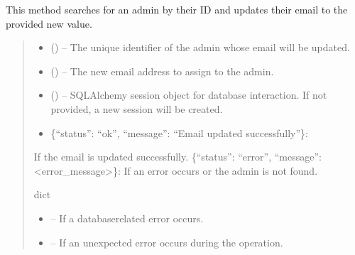 \documentclass[letterpaper,10pt,english]{sphinxmanual}
\begin{document}
\begin{fulllineitems}
\begin{fulllineitems}
\sphinxAtStartPar
This method searches for an admin by their ID and updates their email to the provided new value.
\begin{quote}\begin{description}
\begin{itemize}
\item {} 
\sphinxAtStartPar
{} () – The unique identifier of the admin whose email will be updated.

\item {} 
\sphinxAtStartPar
{} () – The new email address to assign to the admin.

\item {} 
\sphinxAtStartPar
{} (\sphinxstyleliteralemphasis{\sphinxupquote{, }}) – SQLAlchemy session object for database interaction.
If not provided, a new session will be created.

\end{itemize}

\sphinxAtStartPar
\begin{description}
\begin{itemize}
\item {} 
\sphinxAtStartPar
\{“status”: “ok”, “message”: “Email updated successfully”\}:

\end{itemize}

\sphinxAtStartPar
If the email is updated successfully.
\sphinxhyphen{} \{“status”: “error”, “message”: <error\_message>\}:
If an error occurs or the admin is not found.

\end{description}


\sphinxAtStartPar
dict

\begin{itemize}
\item {} 
\sphinxAtStartPar
{} – If a database\sphinxhyphen{}related error occurs.

\item {} 
\sphinxAtStartPar
{} – If an unexpected error occurs during the operation.


\end{itemize}
\end{description}
\end{quote}
\end{fulllineitems}
\end{fulllineitems}
\end{document}
